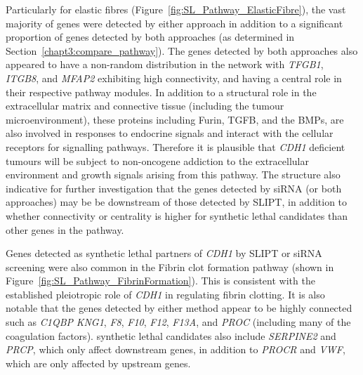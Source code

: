 Particularly for elastic fibres (Figure~\ref{fig:SL_Pathway_ElasticFibre}), the vast majority of genes were detected by either approach in addition to a significant proportion of genes detected by both approaches (as determined in Section~\ref{chapt3:compare_pathway}). The genes detected by both approaches also appeared to have a non-random distribution in the network with \textit{TFGB1}, \textit{ITGB8}, and \textit{MFAP2} exhibiting high connectivity, and having a central role in their respective pathway modules. In addition to a structural role in the extracellular matrix and connective tissue (including the tumour microenvironment), these proteins including Furin, \gls{TGFB}, and the \glspl{BMP}, are also involved in responses to endocrine signals and interact with the cellular receptors for signalling pathways. Therefore it is plausible that \textit{CDH1} deficient tumours will be subject to \gls{non-oncogene addiction} to the extracellular environment and growth signals arising from this pathway. The  structure also indicative for further investigation that the genes detected by \gls{siRNA} (or both approaches) may be be downstream of those detected by \gls{SLIPT}, in addition to whether connectivity or \gls{centrality} is higher for \gls{synthetic lethal} candidates than other genes in the pathway.

Genes detected as \gls{synthetic lethal} partners of \textit{CDH1} by \gls{SLIPT} or \gls{siRNA} screening were also common in the Fibrin clot formation pathway (shown in Figure~\ref{fig:SL_Pathway_FibrinFormation}). This is consistent with the established pleiotropic role of \textit{CDH1} in regulating fibrin clotting. It is also notable that the genes detected by either method appear to be highly connected such as \textit{C1QBP} \textit{KNG1}, \textit{F8}, \textit{F10}, \textit{F12}, \textit{F13A}, and \textit{PROC} (including many of the coagulation factors). \Gls{synthetic lethal} candidates also include \textit{SERPINE2} and \textit{PRCP}, which only affect downstream genes, in addition to \textit{PROCR} and \textit{VWF}, which are only affected by upstream genes. 

\begin{figure*}[!htb]
  \begin{center}
   }
   \end{center}
   \caption[Synthetic lethality in Fibrin Clot Formation]{\small \textbf{Synthetic lethality in Fibrin Clot Formation.} The Reactome Fibrin Clot Formation pathway with \gls{synthetic lethal} candidates coloured as shown in the legend.
}
\label{fig:SL_Pathway_FibrinFormation}
\end{figure*}


